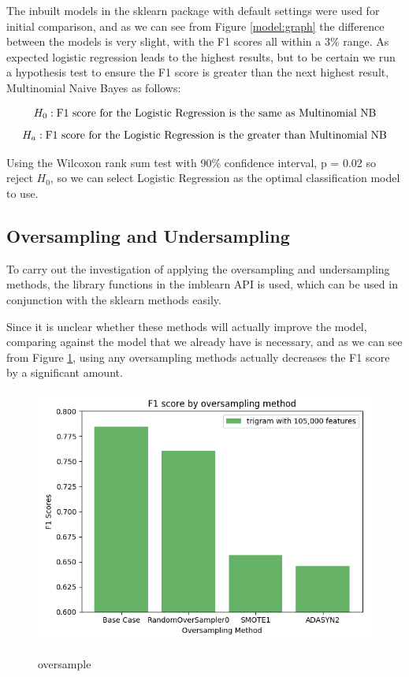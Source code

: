 The inbuilt models in the sklearn package with default settings were used for initial comparison, and as we can see from Figure \ref{model:graph} the difference between the models is very slight, with the F1 scores all within a 3\% range. As expected logistic regression leads to the highest results, but to be certain we run a hypothesis test to ensure the F1 score is greater than the next highest result, Multinomial Naive Bayes as follows:

$$ H_0: \textnormal{F1 score for the Logistic Regression is the same as Multinomial NB}$$
$$ H_a: \textnormal{F1 score for the Logistic Regression is the greater than Multinomial NB}$$

Using the Wilcoxon rank sum test with 90\% confidence interval, p = 0.02 so reject $H_0$, so we can select Logistic Regression as the optimal classification model to use.


\subsection{Oversampling and Undersampling}

To carry out the investigation of applying the oversampling and undersampling methods, the library functions in the imblearn API is used, which can be used in conjunction with the sklearn methods easily. 

Since it is unclear whether these methods will actually improve the model, comparing against the model that we already have is necessary, and as we can see from Figure \ref{oversamplegraph}, using any oversampling methods actually decreases the F1 score by a significant amount. 


\begin{figure}[ht]
\caption{oversample}
\centering
\includegraphics[scale=0.7]{graphs/oversampling.png}
\label{oversamplegraph}
\end{figure}

